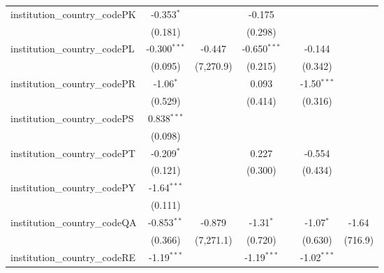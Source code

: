 \begin{tabular}{lcccccc}
   institution\_country\_codePK          & -0.353$^{*}$   &               & -0.175         &                &                &   \\   
                                         & (0.181)        &               & (0.298)        &                &                &   \\   
   institution\_country\_codePL          & -0.300$^{***}$ & -0.447        & -0.650$^{***}$ &                & -0.144         &   \\   
                                         & (0.095)        & (7,270.9)     & (0.215)        &                & (0.342)        &   \\   
   institution\_country\_codePR          & -1.06$^{*}$    &               & 0.093          &                & -1.50$^{***}$  &   \\   
                                         & (0.529)        &               & (0.414)        &                & (0.316)        &   \\   
   institution\_country\_codePS          & 0.838$^{***}$  &               &                &                &                &   \\   
                                         & (0.098)        &               &                &                &                &   \\   
   institution\_country\_codePT          & -0.209$^{*}$   &               & 0.227          &                & -0.554         &   \\   
                                         & (0.121)        &               & (0.300)        &                & (0.434)        &   \\   
   institution\_country\_codePY          & -1.64$^{***}$  &               &                &                &                &   \\   
                                         & (0.111)        &               &                &                &                &   \\   
   institution\_country\_codeQA          & -0.853$^{**}$  & -0.879        & -1.31$^{*}$    &                & -1.07$^{*}$    & -1.64\\   
                                         & (0.366)        & (7,271.1)     & (0.720)        &                & (0.630)        & (716.9)\\   
   institution\_country\_codeRE          & -1.19$^{***}$  &               & -1.19$^{***}$  &                & -1.02$^{***}$  &   \\   

\end{tabular}
